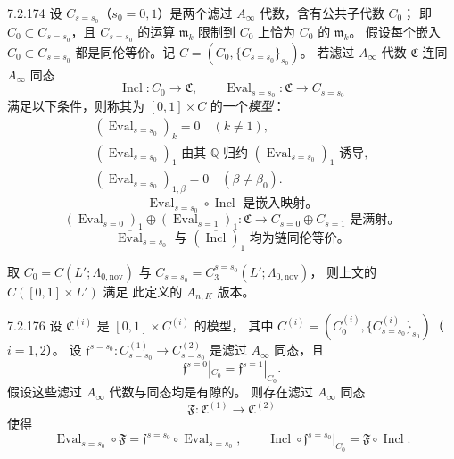 \begin{definition}{7.2.174}\label{def:7-2-174}
%
设 $C_{s=s_0}$（$s_0=0,1$）是两个滤过
$A_\infty$ 代数，含有公共子代数 $C_0$；
即 $C_0\subset C_{s=s_0}$，且
$C_{s=s_0}$ 的运算 $\mathfrak m_k$ 限制到
$C_0$ 上恰为 $C_0$ 的 $\mathfrak m_k$。
假设每个嵌入 $C_0\subset C_{s=s_0}$
都是同伦等价。记
$C=(C_0,\{C_{s=s_0}\}_{s_0})$。
若滤过 $A_\infty$ 代数 $\mathfrak C$
连同 $A_\infty$ 同态%
\[
\operatorname{Incl}\colon C_0\to\mathfrak C,
\qquad
\operatorname{Eval}_{s=s_0}\colon
\mathfrak C\to C_{s=s_0}
\]
满足以下条件，则称其为 $[0,1]\times C$ 的一个\emph{模型}：
\begin{equation}
\begin{gathered}
(\operatorname{Eval}_{s=s_0})_k=0
\quad(k\ne1),\\
(\operatorname{Eval}_{s=s_0})_1
\text{ 由其 $\mathbb Q$-归约 }
(\overline{\operatorname{Eval}}_{s=s_0})_1
\text{ 诱导},\\
(\operatorname{Eval}_{s=s_0})_{1,\beta}=0
\quad(\beta\ne\beta_0).
\end{gathered}
\tag{7.2.175.1}\label{eq:7-2-175-1}
\end{equation}
\begin{equation}
\operatorname{Eval}_{s=s_0}\circ\operatorname{Incl}
\text{ 是嵌入映射。}
\tag{7.2.175.2}\label{eq:7-2-175-2}
\end{equation}
\begin{equation}
(\operatorname{Eval}_{s=0})_1\oplus
(\operatorname{Eval}_{s=1})_1\colon
\mathfrak C\longrightarrow C_{s=0}\oplus C_{s=1}
\text{ 是满射。}
\tag{7.2.175.3}\label{eq:7-2-175-3}
\end{equation}
\begin{equation}
\overline{\operatorname{Eval}}_{s=s_0}
\text{ 与 }
(\overline{\operatorname{Incl}})_1
\text{ 均为链同伦等价。}
\tag{7.2.175.4}\label{eq:7-2-175-4}
\end{equation}
\end{definition}

取 $C_0=C(L';\Lambda_{0,\mathrm{nov}})$ 与
$C_{s=s_0}=C_3^{s=s_0}(L';\Lambda_{0,\mathrm{nov}})$，
则上文的 $C([0,1]\times L')$ 满足
此定义的 $A_{n,K}$ 版本。

\begin{theorem}{7.2.176}\label{thm:7-2-176}
设 $\mathfrak C^{(i)}$ 是
$[0,1]\times C^{(i)}$ 的模型，
其中 $C^{(i)}=(C_0^{(i)},
\{C_{s=s_0}^{(i)}\}_{s_0})$（$i=1,2$）。
设 $\mathfrak f^{s=s_0}\colon
C_{s=s_0}^{(1)}\to C_{s=s_0}^{(2)}$
是滤过 $A_\infty$ 同态，且
\[
\mathfrak f^{s=0}|_{C_0}
=\mathfrak f^{s=1}|_{C_0}.
\]
假设这些滤过 $A_\infty$ 代数与同态均是有隙的。
则存在滤过 $A_\infty$ 同态
\[
\mathfrak F\colon\mathfrak C^{(1)}\to\mathfrak C^{(2)}
\]
使得
\[
\operatorname{Eval}_{s=s_0}\circ\mathfrak F
=\mathfrak f^{s=s_0}\circ\operatorname{Eval}_{s=s_0},
\qquad
\operatorname{Incl}\circ\mathfrak f^{s=s_0}|_{C_0}
=\mathfrak F\circ\operatorname{Incl}.
\]
\end{theorem}

